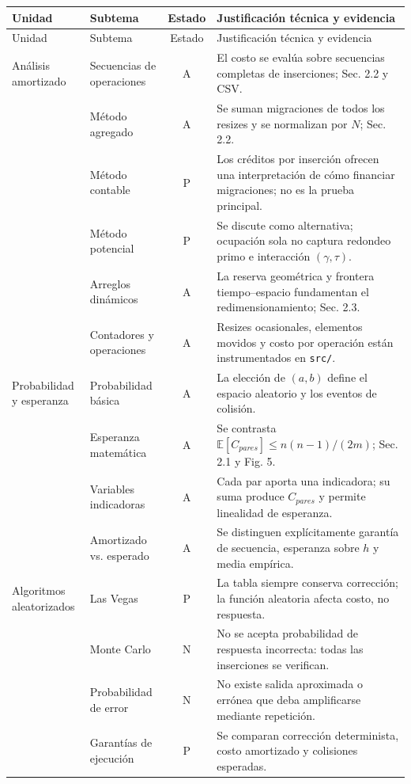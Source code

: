 \small
\begin{longtable}{p{2.7cm}p{3.4cm}c p{6.2cm}}
\toprule
Unidad & Subtema & Estado & Justificación técnica y evidencia \\
\midrule\endfirsthead
\toprule Unidad & Subtema & Estado & Justificación técnica y evidencia \\\midrule\endhead
Análisis amortizado & Secuencias de operaciones & A & El costo se evalúa sobre secuencias completas de inserciones; Sec. 2.2 y CSV.\\
& Método agregado & A & Se suman migraciones de todos los resizes y se normalizan por $N$; Sec. 2.2.\\
& Método contable & P & Los créditos por inserción ofrecen una interpretación de cómo financiar migraciones; no es la prueba principal.\\
& Método potencial & P & Se discute como alternativa; ocupación sola no captura redondeo primo e interacción $(\gamma,\tau)$.\\
& Arreglos dinámicos & A & La reserva geométrica y frontera tiempo--espacio fundamentan el redimensionamiento; Sec. 2.3.\\
& Contadores y operaciones & A & Resizes ocasionales, elementos movidos y costo por operación están instrumentados en \texttt{src/}.\\
\midrule
Probabilidad y esperanza & Probabilidad básica & A & La elección de $(a,b)$ define el espacio aleatorio y los eventos de colisión.\\
& Esperanza matemática & A & Se contrasta $\mathbb{E}[C_{pares}]\le n(n-1)/(2m)$; Sec. 2.1 y Fig. 5.\\
& Variables indicadoras & A & Cada par aporta una indicadora; su suma produce $C_{pares}$ y permite linealidad de esperanza.\\
& Amortizado vs. esperado & A & Se distinguen explícitamente garantía de secuencia, esperanza sobre $h$ y media empírica.\\
\midrule
Algoritmos aleatorizados & Las Vegas & P & La tabla siempre conserva corrección; la función aleatoria afecta costo, no respuesta.\\
& Monte Carlo & N & No se acepta probabilidad de respuesta incorrecta: todas las inserciones se verifican.\\
& Probabilidad de error & N & No existe salida aproximada o errónea que deba amplificarse mediante repetición.\\
& Garantías de ejecución & P & Se comparan corrección determinista, costo amortizado y colisiones esperadas.\\

\end{longtable}
